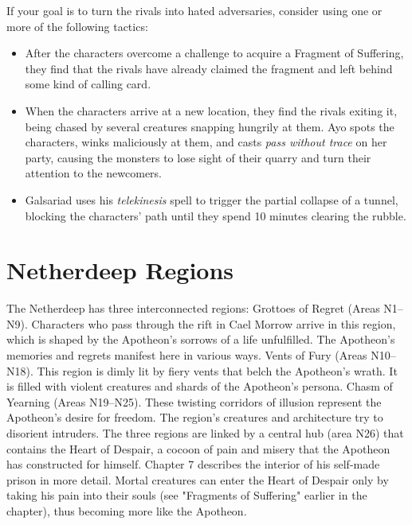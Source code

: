 \documentclass[10pt,a4,twoside,twocolumn,openany,nodeprecatedcode]{dndbook}
\begin{document}
If your goal is to turn the rivals into hated adversaries, consider using one or more of the following tactics:
\begin{itemize}

\item After the characters overcome a challenge to acquire a Fragment of Suffering, they find that the rivals have already claimed the fragment and left behind some kind of calling card.
\item When the characters arrive at a new location, they find the rivals exiting it, being chased by several creatures snapping hungrily at them. Ayo spots the characters, winks maliciously at them, and casts \textit{pass without trace} on her party, causing the monsters to lose sight of their quarry and turn their attention to the newcomers.
\item Galsariad uses his \textit{telekinesis} spell to trigger the partial collapse of a tunnel, blocking the characters' path until they spend 10 minutes clearing the rubble.
\end{itemize}


\section{Netherdeep Regions}
The Netherdeep has three interconnected regions:
Grottoes of Regret (Areas N1–N9). Characters who pass through the rift in Cael Morrow arrive in this region, which is shaped by the Apotheon's sorrows of a life unfulfilled. The Apotheon's memories and regrets manifest here in various ways.
Vents of Fury (Areas N10–N18). This region is dimly lit by fiery vents that belch the Apotheon's wrath. It is filled with violent creatures and shards of the Apotheon's persona.
Chasm of Yearning (Areas N19–N25). These twisting corridors of illusion represent the Apotheon's desire for freedom. The region's creatures and architecture try to disorient intruders.
The three regions are linked by a central hub (area N26) that contains the Heart of Despair, a cocoon of pain and misery that the Apotheon has constructed for himself. Chapter 7 describes the interior of his self-made prison in more detail. Mortal creatures can enter the Heart of Despair only by taking his pain into their souls (see "Fragments of Suffering" earlier in the chapter), thus becoming more like the Apotheon.
\end{document}
